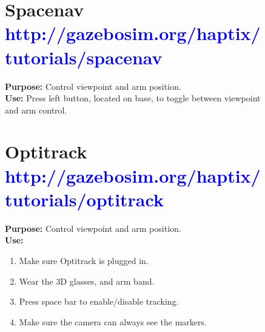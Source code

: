 \documentclass[11pt, letterpaper, landscape]{article}
\begin{document}
\begin{figure}[!htb]
  \centering

  \begin{minipage}[t]{0.48\textwidth}
    \begin{tcolorbox}[height=6cm,colback=gray!8,colframe=gray!15]
      \section*{Spacenav \textcolor{blue}{\textnormal{\small http://gazebosim.org/haptix/tutorials/spacenav}}}
      {\bf Purpose:} Control viewpoint and arm position.\\
      {\bf Use:} Press left button, located on base, to toggle between viewpoint and arm control.
    \end{tcolorbox}
  \end{minipage}%
  \hspace{0.02\textwidth}%
  \begin{minipage}[t]{0.48\textwidth}
    \begin{tcolorbox}[height=6cm,colback=gray!8,colframe=gray!15]
      \section*{Optitrack \textcolor{blue}{\textnormal{\small http://gazebosim.org/haptix/tutorials/optitrack}}}
      {\bf Purpose:} Control viewpoint and arm position.\\
      {\bf Use:}
      \begin{enumerate}
        \item Make sure Optitrack is plugged in.
        \item Wear the 3D glasses, and arm band. 
        \item Press space bar to enable/disable tracking. 
        \item Make sure the camera can always see the markers.
      \end{enumerate}
    \end{tcolorbox}
  \end{minipage}%

\end{figure}
\end{document}
